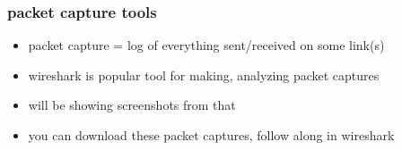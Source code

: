 \begin{frame}\frametitle{packet capture tools}
    \begin{itemize}
    \item packet capture = log of everything sent/received on some link(s)
    \item wireshark is popular tool for making, analyzing packet captures
    \vspace{.5cm}
    \item will be showing screenshots from that
    \vspace{.5cm}
    \item you can download these packet captures, follow along in wireshark
    \end{itemize}
\end{frame}
